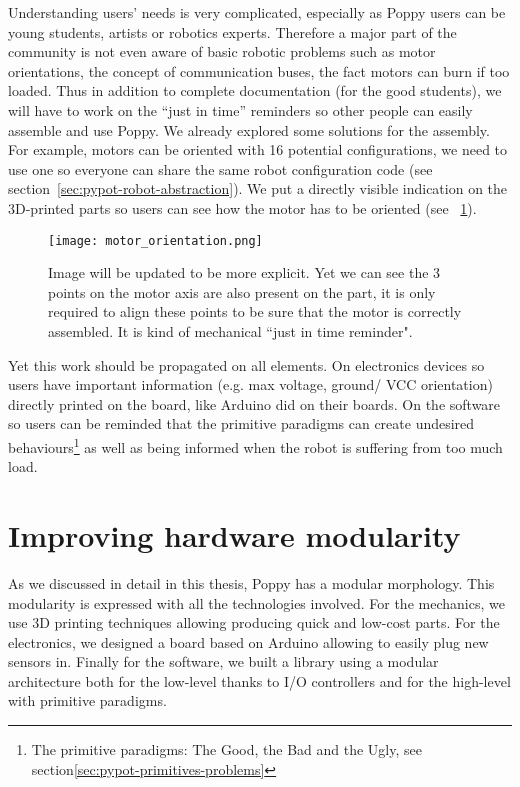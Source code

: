 Understanding users’ needs is very complicated, especially as Poppy users can be young students, artists or robotics experts. Therefore a major part of the community is not even aware of basic robotic problems such as motor orientations, the concept of communication buses, the fact motors can burn if too loaded. Thus in addition to complete documentation (for the good students), we will have to work on the “just in time” reminders so other people can easily assemble and use Poppy.
We already explored some solutions for the assembly. For example, motors can be oriented with 16 potential configurations, we need to use one so everyone can share the same robot configuration code (see section~\ref{sec:pypot-robot-abstraction}). We put a directly visible indication on the 3D-printed parts so users can see how the motor has to be oriented (see \figurename~\ref{fig:motor_orientation}).
\begin{figure}[tb]
    \centering
        \texttt{[image: motor\_orientation.png]}
    \caption{Image will be updated to be more explicit. Yet we can see the 3 points on the motor axis are also present on the part, it is only required to align these points to be sure that the motor is correctly assembled. It is kind of mechanical “just in time reminder".}
    \label{fig:motor_orientation}
\end{figure}

Yet this work should be propagated on all elements. On electronics devices so users have important information (e.g. max voltage, ground/ VCC orientation) directly printed on the board, like Arduino did on their boards. On the software so users can be reminded that the primitive paradigms can create undesired behaviours\footnote{The primitive paradigms: The Good, the Bad and the Ugly, see section\ref{sec:pypot-primitives-problems}} as well as being informed when the robot is suffering from too much load.



\section{Improving hardware modularity} %
\label{sec:improve-hardware-modularity}

As we discussed in detail in this thesis, Poppy has a modular morphology. This modularity is expressed with all the technologies involved. For the mechanics, we use 3D printing techniques allowing producing quick and low-cost parts. For the electronics, we designed a board based on Arduino allowing to easily plug new sensors in. Finally for the software, we built a library using a modular architecture both for the low-level thanks to I/O controllers and for the high-level with primitive paradigms.

